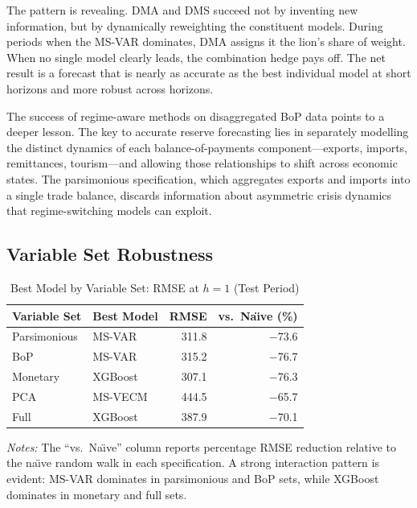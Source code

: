 \documentclass[12pt,a4paper]{article}
\begin{document}
The pattern is revealing. DMA and DMS succeed not by inventing new information, but by dynamically reweighting the constituent models. During periods when the MS-VAR dominates, DMA assigns it the lion's share of weight. When no single model clearly leads, the combination hedge pays off. The net result is a forecast that is nearly as accurate as the best individual model at short horizons and more robust across horizons.

The success of regime-aware methods on disaggregated BoP data points to a deeper lesson. The key to accurate reserve forecasting lies in separately modelling the distinct dynamics of each balance-of-payments component---exports, imports, remittances, tourism---and allowing those relationships to shift across economic states. The parsimonious specification, which aggregates exports and imports into a single trade balance, discards information about asymmetric crisis dynamics that regime-switching models can exploit.

\subsection{Variable Set Robustness}

\begin{table}[htbp]
\centering
\caption{Best Model by Variable Set: RMSE at $h = 1$ (Test Period)}
\label{tab:best_by_varset}
\begin{tabular}{llrr}
\toprule
Variable Set & Best Model & RMSE & vs.\ Na\"{\i}ve (\%) \\
\midrule
Parsimonious & MS-VAR & 311.8 & $-$73.6 \\
BoP & MS-VAR & 315.2 & $-$76.7 \\
Monetary & XGBoost & 307.1 & $-$76.3 \\
PCA & MS-VECM & 444.5 & $-$65.7 \\
Full & XGBoost & 387.9 & $-$70.1 \\
\bottomrule
\end{tabular}
\begin{tablenotes}
\small
\item \textit{Notes:} The ``vs.\ Na\"{\i}ve'' column reports percentage RMSE reduction relative to the na\"{\i}ve random walk in each specification. A strong interaction pattern is evident: MS-VAR dominates in parsimonious and BoP sets, while XGBoost dominates in monetary and full sets.
\end{tablenotes}
\end{table}
\end{document}
